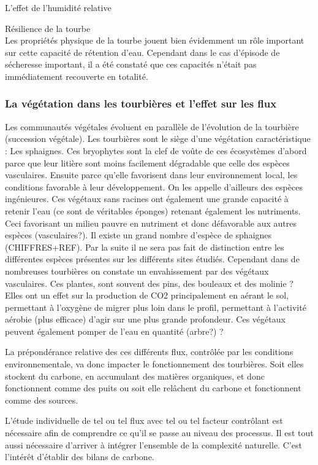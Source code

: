 L'effet de l'humidité relative \par

Résilience de la tourbe\\
Les propriétés physique de la tourbe jouent bien évidemment un rôle important sur cette capacité de rétention d'eau.
Cependant dans le cas d'épisode de sécheresse important, il a été constaté que ces capacités n'était pas immédiatement recouverte en totalité.


\subsubsection{La végétation dans les tourbières et l'effet sur les flux}
Les communautés végétales évoluent en parallèle de l'évolution de la tourbière (succession végétale).
Les tourbières sont le siège d'une végétation caractéristique : Les sphaignes.
Ces bryophytes sont la clef de voûte de ces écosystèmes d'abord parce que leur litière sont moins facilement dégradable que celle des espèces vasculaires.
Ensuite parce qu'elle favorisent dans leur environnement local, les conditions favorable à leur développement. 
On les appelle d'ailleurs des espèces ingénieures.
Ces végétaux sans racines ont également une grande capacité à retenir l'eau (ce sont de véritables éponges) retenant également les nutriments. 
Ceci favorisant un milieu pauvre en nutriment et donc défavorable aux autres espèces (vasculaires?).
Il existe un grand nombre d'espèce de sphaignes (CHIFFRES+REF).
Par la suite il ne sera pas fait de distinction entre les différentes espèces présentes sur les différents sites étudiés.
Cependant dans de nombreuses tourbières on constate un envahissement par des végétaux vasculaires.
Ces plantes, sont souvent des pins, des bouleaux et des molinie ?
Elles ont un effet sur la production de CO2 principalement en aérant le sol, permettant à l'oxygène de migrer plus loin dans le profil, permettant à l'activité aérobie (plus efficace) d'agir sur une plus grande profondeur.
Ces végétaux peuvent également pomper de l'eau en quantité (arbre?) ?


La prépondérance relative des ces différents flux, contrôlée par les conditions environnementale, va donc impacter le fonctionnement des tourbières. 
Soit elles stockent du carbone, en accumulant des matières organiques, et donc fonctionnent comme des puits ou soit elle relâchent du carbone et fonctionnent comme des sources.


L'étude individuelle de tel ou tel flux avec tel ou tel facteur contrôlant est nécessaire afin de comprendre ce qu'il se passe au niveau des processus. Il est tout aussi nécessaire d'arriver à intégrer l'ensemble de la complexité naturelle.
C'est l'intérêt d'établir des bilans de carbone.

